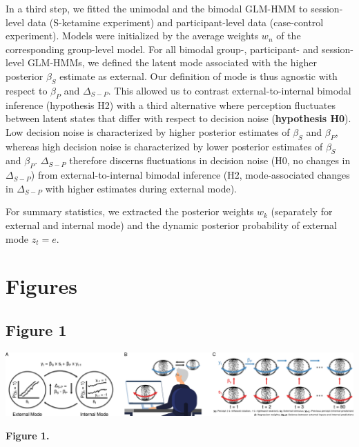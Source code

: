 \documentclass[
]{article}
\begin{document}
In a third step, we fitted the unimodal and the bimodal GLM-HMM to
session-level data (S-ketamine experiment) and participant-level data
(case-control experiment). Models were initialized by the average
weights \(w_n\) of the corresponding group-level model. For all bimodal
group-, participant- and session-level GLM-HMMs, we defined the latent
mode associated with the higher posterior \(\beta_S\) estimate as
external. Our definition of mode is thus agnostic with respect to
\(\beta_P\) and \(\Delta_{S-P}\). This allowed us to contrast
external-to-internal bimodal inference (hypothesis H2) with a third
alternative where perception fluctuates between latent states that
differ with respect to decision noise (\textbf{hypothesis H0}). Low
decision noise is characterized by higher posterior estimates of
\(\beta_S\) and \(\beta_P\), whereas high decision noise is
characterized by lower posterior estimates of \(\beta_S\) and
\(\beta_P\). \(\Delta_{S-P}\) therefore discerns fluctuations in
decision noise (H0, no changes in \(\Delta_{S-P}\)) from
external-to-internal bimodal inference (H2, mode-associated changes in
\(\Delta_{S-P}\) with higher estimates during external mode).

For summary statistics, we extracted the posterior weights \(w_k\)
(separately for external and internal mode) and the dynamic posterior
probability of external mode \(z_t = e\).

\newpage

\hypertarget{figures}{%
\section{Figures}\label{figures}}

\hypertarget{figure-1}{%
\subsection{Figure 1}\label{figure-1}}

\includegraphics{./Material/Figure_1.png}

\textbf{Figure 1.}
\end{document}
